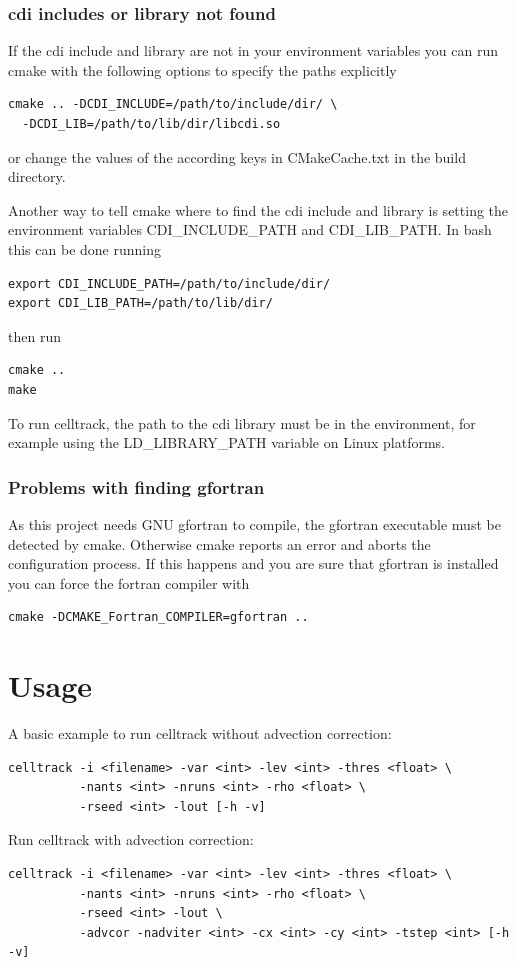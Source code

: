 \documentclass{scrartcl}
\begin{document}
\subsubsection{cdi includes or library not found}
If the cdi include and library are not in your environment variables you can run cmake with the following options to specify the paths explicitly
\begin{verbatim}
cmake .. -DCDI_INCLUDE=/path/to/include/dir/ \
  -DCDI_LIB=/path/to/lib/dir/libcdi.so
\end{verbatim}
or change the values of the according keys in CMakeCache.txt in the build directory.

Another way to tell cmake where to find the cdi include and library is setting the environment variables CDI\_INCLUDE\_PATH and CDI\_LIB\_PATH. In bash this can be done running
\begin{verbatim}
export CDI_INCLUDE_PATH=/path/to/include/dir/
export CDI_LIB_PATH=/path/to/lib/dir/
\end{verbatim}
then run
\begin{verbatim}
cmake ..
make
\end{verbatim}
To run celltrack, the path to the cdi library must be in the environment, for example using the LD\_LIBRARY\_PATH variable on Linux platforms.

\subsubsection{Problems with finding gfortran}
As this project needs GNU gfortran to compile, the gfortran executable must be detected by cmake. Otherwise cmake reports an error and aborts the configuration process. If this happens and you are sure that gfortran is installed you can force the fortran compiler with
\begin{verbatim}
cmake -DCMAKE_Fortran_COMPILER=gfortran ..
\end{verbatim}

\section{Usage}
A basic example to run celltrack without advection correction:
\begin{verbatim}
celltrack -i <filename> -var <int> -lev <int> -thres <float> \
          -nants <int> -nruns <int> -rho <float> \
          -rseed <int> -lout [-h -v]
\end{verbatim}   
Run celltrack with advection correction:
\begin{verbatim}       
celltrack -i <filename> -var <int> -lev <int> -thres <float> \
          -nants <int> -nruns <int> -rho <float> \
          -rseed <int> -lout \
          -advcor -nadviter <int> -cx <int> -cy <int> -tstep <int> [-h -v]
\end{verbatim}
\end{document}
